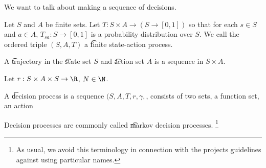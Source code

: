 
We want to talk about making a sequence of decisions.


Let $S$ and $A$ be finite sets.
Let $T: S \times A \to (S \to [0, 1])$ so that for each $s \in S$ and $a \in A$, $T_{sa}: S \to [0, 1]$ is a probability distribution over $S$.
We call the ordered triple $(S, A, T)$ a \t{finite state-action process}.

A \t{trajectory} in the \t{state set} $S$ and \t{action set} $A$ is a sequence in $S \times A$.

Let $r: S \times A \times S \to \R$, $N \in \N$.

A \t{decision process} is a sequence $(S, A, T, r, \gamma, $, consists of two sets, a function set, an action

Decision processes are commonly called \t{markov decision processes}.
  \ifhmode\unskip\fi\footnote{
As usual, we avoid this terminology in connection with the projects guidelines against using particular names.
  }

\blankpage

